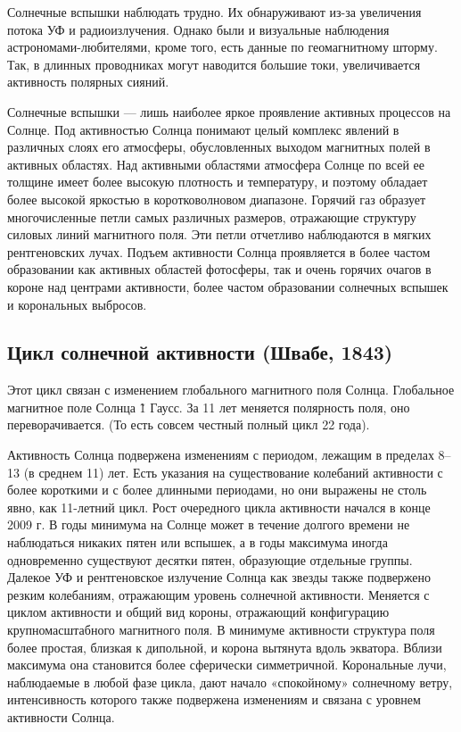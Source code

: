 Солнечные вспышки наблюдать трудно. Их обнаруживают из-за увеличения потока УФ и радиоизлучения. Однако были и визуальные наблюдения астрономами-любителями, кроме того, есть данные по геомагнитному шторму. Так, в длинных проводниках могут наводится большие токи, увеличивается активность полярных сияний.

Солнечные вспышки — лишь наиболее яркое проявление активных процессов на Солнце. Под активностью Солнца понимают целый комплекс явлений в различных слоях его атмосферы, обусловленных выходом магнитных полей в активных областях. Над активными областями атмосфера Солнце по всей ее толщине имеет более высокую плотность и температуру, и поэтому обладает более высокой яркостью в коротковолновом диапазоне. Горячий газ образует многочисленные петли самых различных размеров, отражающие структуру силовых линий магнитного поля. Эти петли отчетливо наблюдаются в мягких рентгеновских лучах. Подъем активности Солнца проявляется в более частом образовании как активных областей фотосферы, так и очень горячих очагов в короне над центрами активности, более частом образовании солнечных вспышек и корональных выбросов.

\subsection{Цикл солнечной активности (Швабе, 1843)} 

Этот цикл связан с изменением глобального магнитного поля Солнца. Глобальное магнитное поле Солнца \~ 1 Гаусс. За 11 лет меняется полярность поля, оно переворачивается. (То есть совсем честный полный цикл 22 года). 

Активность Солнца подвержена изменениям с периодом, лежащим в пределах 8–13 (в среднем 11) лет. Есть указания на существование колебаний активности с более короткими и с более длинными периодами, но они выражены не столь явно, как 11-летний цикл. Рост очередного цикла активности начался в конце 2009 г. В годы минимума на Солнце может в течение долгого времени не наблюдаться никаких пятен или вспышек, а в годы максимума иногда одновременно существуют десятки пятен, образующие отдельные группы. Далекое УФ и рентгеновское излучение Солнца как звезды также подвержено резким колебаниям, отражающим уровень солнечной активности. Меняется с циклом активности и общий вид короны, отражающий конфигурацию крупномасштабного магнитного поля. В минимуме активности структура поля более простая, близкая к дипольной, и корона вытянута вдоль экватора. Вблизи максимума она становится более сферически симметричной. Корональные лучи, наблюдаемые в любой фазе цикла, дают начало «спокойному» солнечному ветру, интенсивность которого также подвержена изменениям и связана с уровнем активности Солнца.

